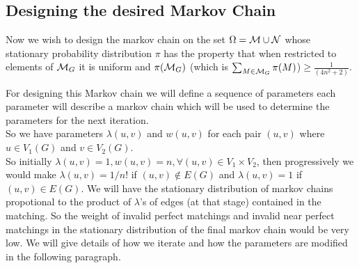 \subsection{Designing the desired Markov Chain}
Now we wish to design the markov chain on the set $\Omega=\mathcal{M} \cup \mathcal{N}$ whose stationary probability distribution $\pi$ has the property that when restricted to elements of $\mathcal{M}_G$ it is uniform and $\pi(\mathcal{M}_G) $ (which is $\sum_{M\in \mathcal{M}_G} \pi(M)$)$\geq \frac{1}{(4n^2+2)}$.\\
\begin{flushleft}
	For designing this Markov chain we will define a sequence of parameters each parameter will describe a markov chain which will be used to determine the parameters for the next iteration.\\
	So we have parameters $\lambda(u,v)$ and $w(u,v)$ for each pair $(u,v) $ where $u\in V_1(G)$ and $v \in V_2(G)$. 
	\\
	So initially $\lambda(u,v)=1, w(u,v)=n ,\forall (u,v) \in V_1 \times V_2 $, then progressively we would make $\lambda(u,v)=1/n!$ if $(u,v)\notin E(G)$ and $\lambda(u,v)=1$ if $(u,v) \in E(G)$. We will have the stationary distribution of markov chains propotional to the product of $\lambda$'s of edges (at that stage) contained in the matching. So the weight of invalid perfect matchings and invalid near perfect matchings in the stationary distribution of the final markov chain would be very low. We will give details of how we iterate and how the parameters are modified in the following paragraph.
\end{flushleft}
